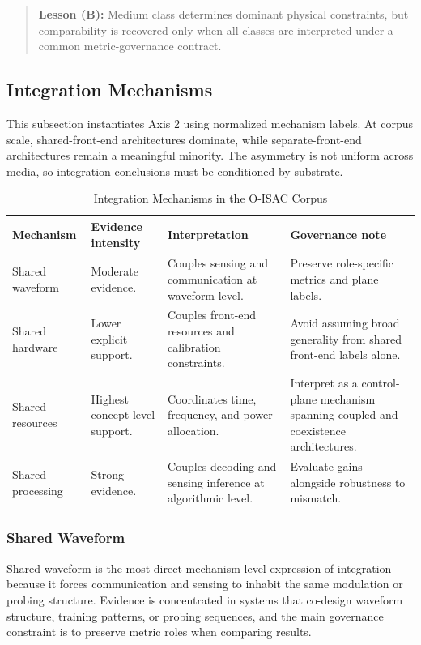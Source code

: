 \begin{quote}
\textbf{Lesson (B):} Medium class determines dominant physical constraints, but comparability is recovered only when all classes are interpreted under a common metric-governance contract.
\end{quote}

\subsection{Integration Mechanisms}
This subsection instantiates Axis 2 using normalized mechanism labels. At corpus scale, shared-front-end architectures dominate, while separate-front-end architectures remain a meaningful minority. The asymmetry is not uniform across media, so integration conclusions must be conditioned by substrate.

\begin{table}[!t]
\caption{Integration Mechanisms in the O-ISAC Corpus}
\label{tab:integration-mechanisms}
\centering
\footnotesize
\setlength{\tabcolsep}{4pt}
\begin{tabularx}{\textwidth}{p{}p{}p{}X}
\toprule
\textbf{Mechanism} & \textbf{Evidence intensity} & \textbf{Interpretation} & \textbf{Governance note} \\
\midrule
Shared waveform & Moderate evidence. & Couples sensing and communication at waveform level. & Preserve role-specific metrics and plane labels. \\
Shared hardware & Lower explicit support. & Couples front-end resources and calibration constraints. & Avoid assuming broad generality from shared front-end labels alone. \\
Shared resources & Highest concept-level support. & Coordinates time, frequency, and power allocation. & Interpret as a control-plane mechanism spanning coupled and coexistence architectures. \\
Shared processing & Strong evidence. & Couples decoding and sensing inference at algorithmic level. & Evaluate gains alongside robustness to mismatch. \\
\bottomrule
\end{tabularx}
\end{table}

\subsubsection{Shared Waveform}
Shared waveform is the most direct mechanism-level expression of integration because it forces communication and sensing to inhabit the same modulation or probing structure. Evidence is concentrated in systems that co-design waveform structure, training patterns, or probing sequences, and the main governance constraint is to preserve metric roles when comparing results.

